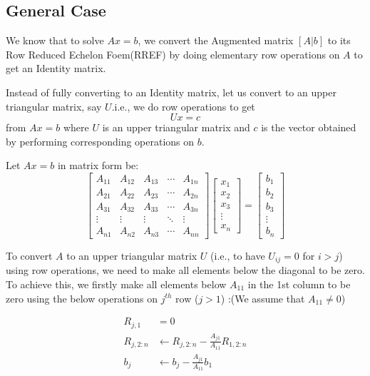 \documentclass[
]{book}
\begin{document}
\hypertarget{general-case}{%
\subsection{General Case}\label{general-case}}

We know that to solve \(Ax=b\), we convert the Augmented matrix \([A|b]\) to its Row Reduced Echelon Foem(RREF) by doing elementary row operations on \(A\) to get an Identity matrix.

Instead of fully converting to an Identity matrix, let us convert to an upper triangular matrix, say \(U\).i.e., we do row operations to get \[Ux=c\] from \(Ax=b\) where \(U\) is an upper triangular matrix and \(c\) is the vector obtained by performing corresponding operations on \(b\).

Let \(Ax=b\) in matrix form be:
\begin{equation}
\begin{bmatrix}
A_{11} & A_{12} & A_{13} & \cdots & A_{1n}\\
A_{21} & A_{22} & A_{23} & \cdots & A_{2n}\\
A_{31} & A_{32} & A_{33} & \cdots & A_{3n}\\
\vdots & \vdots & \vdots & \ddots & \vdots\\
A_{n1} & A_{n2} & A_{n3} & \cdots & A_{nn}
\end{bmatrix}
\begin{bmatrix} x_1 \\ x_2 \\x_3\\ \vdots\\ x_n\end{bmatrix}
=
\begin{bmatrix} b_1 \\ b_2 \\b_3\\ \vdots\\ b_n\end{bmatrix}
\end{equation}

To convert \(A\) to an upper triangular matrix \(U\) (i.e., to have \(U_{ij} = 0\) for \(i>j\)) using row operations, we need to make all elements below the diagonal to be zero. To achieve this, we firstly make all elements below \(A_{11}\) in the 1st column to be zero using the below operations on \(j^{th}\) row (\(j>1\)) :(We assume that \(A_{11}\neq 0\))

\begin{align}
R_{j,1} &=0\\
R_{j,2:n} &\gets R_{j,2:n} - \frac{A_{j1}}{A_{11}}R_{1,2:n} \\
b_j &\gets b_j - \frac{A_{j1}}{A_{11}} b_1
\end{align}
\end{document}
